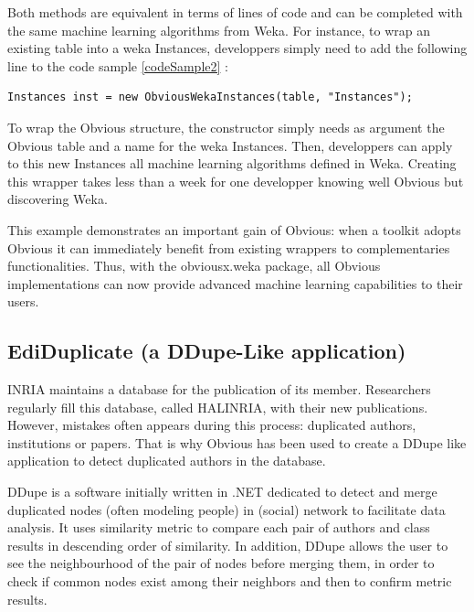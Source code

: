 Both methods are equivalent in terms of lines of code and can be completed with the same machine learning algorithms from Weka. For instance, to wrap an existing table into a weka Instances, developpers simply need to add the following line to the code sample \ref{codeSample2} :

\begin{lstlisting}
Instances inst = new ObviousWekaInstances(table, "Instances");
\end{lstlisting}

To wrap the Obvious structure, the constructor simply needs as argument the Obvious table and a name for the weka Instances. Then, developpers can apply to this new Instances all machine learning algorithms defined in Weka. Creating this wrapper takes less than a week for one developper knowing well Obvious but discovering Weka.

This example demonstrates an important gain of Obvious: when a toolkit adopts Obvious it can immediately benefit from existing wrappers to complementaries functionalities. Thus, with the obviousx.weka package, all Obvious implementations can now provide advanced machine learning capabilities to their users.

\subsection{EdiDuplicate (a DDupe-Like application)}

INRIA maintains a database for the publication of its member. Researchers regularly fill this database, called HALINRIA, with their new publications. However, mistakes often appears during this process: duplicated authors, institutions or papers. That is why Obvious has been used to create a DDupe like application to detect duplicated authors in the database.

DDupe is a software initially written in .NET dedicated to detect and merge duplicated nodes (often modeling people)  in (social) network to facilitate data analysis. It uses similarity metric to compare each pair  of authors and class results in descending order of similarity. In addition, DDupe allows the user to see the neighbourhood of the pair of nodes before merging them, in order to check if common nodes exist among their neighbors and then to confirm metric results.

